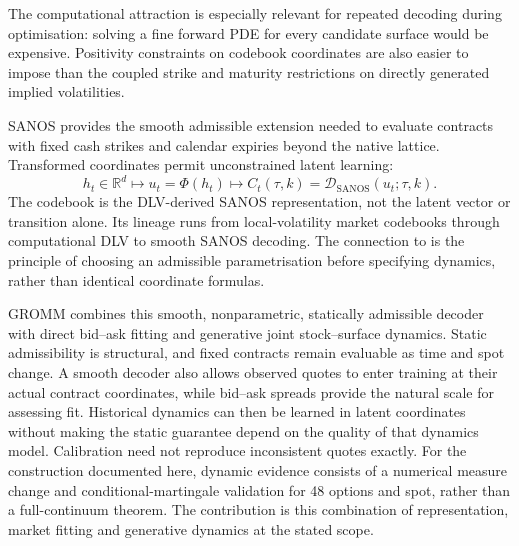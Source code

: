 The computational attraction is especially relevant for repeated decoding during optimisation: solving a fine forward PDE for every candidate surface would be expensive. Positivity constraints on codebook coordinates are also easier to impose than the coupled strike and maturity restrictions on directly generated implied volatilities.

SANOS \cite{sanos} provides the smooth admissible extension needed to evaluate contracts with fixed cash strikes and calendar expiries beyond the native lattice. Transformed coordinates permit unconstrained latent learning:
\[
 h_t\in\mathbb{R}^{d}\longmapsto u_t=\Phi(h_t)
 \longmapsto C_t(\tau,k)=\mathcal{D}_{\mathrm{SANOS}}(u_t;\tau,k).
\]
The codebook is the DLV-derived SANOS representation, not the latent vector or transition alone. Its lineage runs from local-volatility market codebooks through computational DLV to smooth SANOS decoding. The connection to \cite{wisselmulti} is the principle of choosing an admissible parametrisation before specifying dynamics, rather than identical coordinate formulas.

GROMM combines this smooth, nonparametric, statically admissible decoder with direct bid--ask fitting and generative joint stock--surface dynamics. Static admissibility is structural, and fixed contracts remain evaluable as time and spot change. A smooth decoder also allows observed quotes to enter training at their actual contract coordinates, while bid--ask spreads provide the natural scale for assessing fit. Historical dynamics can then be learned in latent coordinates without making the static guarantee depend on the quality of that dynamics model. Calibration need not reproduce inconsistent quotes exactly. For the construction documented here, dynamic evidence consists of a numerical measure change and conditional-martingale validation for 48 options and spot, rather than a full-continuum theorem. The contribution is this combination of representation, market fitting and generative dynamics at the stated scope.

